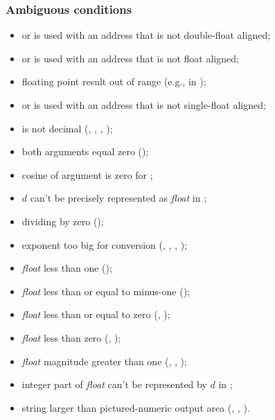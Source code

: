 \subsubsection{Ambiguous conditions} %
\begin{itemize}
\item {} or  is used with an address that is not
	double-float aligned;
\item {} or  is used with an address that is not
	float aligned;
\item floating point result out of range
	(e.g., in );
\item {} or  is used with an address that is not
	single-float aligned;
\item {} is not decimal
	(,
	 ,
	 ,
	 );
\item both arguments equal zero ();
\item cosine of argument is zero for ;
\item $d$ can't be precisely represented as \emph{float} in
	;
\item dividing by zero ();
\item exponent too big for conversion
	(,
	 ,
	 ,
	 );
\item \emph{float} less than one ();
\item \emph{float} less than or equal to minus-one
	();
\item \emph{float} less than or equal to zero
	(,
	 );
\item \emph{float} less than zero
	(,
	 );
\item \emph{float} magnitude greater than one
	(,
	 ,
	 );
\item integer part of \emph{float} can't be represented by $d$ in
	;
\item string larger than pictured-numeric output area
	(,
	 ,
	 ).
\end{itemize}

